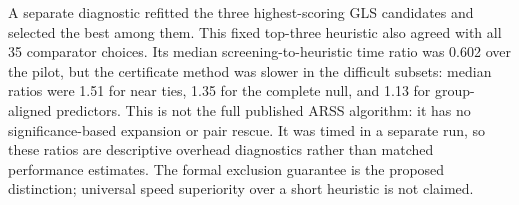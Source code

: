 A separate diagnostic refitted the three highest-scoring GLS candidates and selected the best among them. This fixed top-three heuristic also agreed with all 35 comparator choices. Its median screening-to-heuristic time ratio was 0.602 over the pilot, but the certificate method was slower in the difficult subsets: median ratios were 1.51 for near ties, 1.35 for the complete null, and 1.13 for group-aligned predictors. This is not the full published ARSS algorithm: it has no significance-based expansion or pair rescue. It was timed in a separate run, so these ratios are descriptive overhead diagnostics rather than matched performance estimates. The formal exclusion guarantee is the proposed distinction; universal speed superiority over a short heuristic is not claimed.

